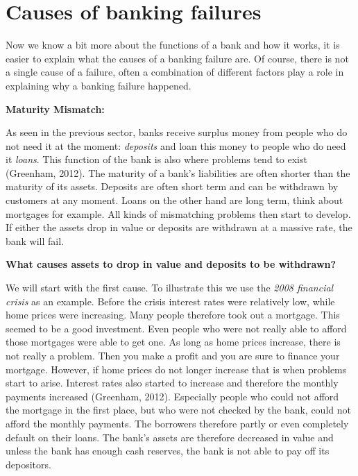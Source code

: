 \documentclass[DIV=calc, paper=a4, fontsize=11pt, twocolumn]{scrartcl}	 %
\begin{document}
\section*{Causes of banking failures}
Now we know a bit more about the functions of a bank and how it works, it is easier to explain what the causes of a banking failure are. Of course, there is not a single cause of a failure, often a combination of different factors play a role in explaining why a banking failure happened.

\textbf{Maturity Mismatch:}

As seen in the previous sector, banks receive surplus money from people who do not need it at the moment: \textit{deposits} and loan this money to people who do need it \textit{loans}. This function of the bank is also where problems tend to exist (Greenham, 2012). The maturity of a bank's liabilities are often shorter than the maturity of its assets. Deposits are often short term and can be withdrawn by customers at any moment. Loans on the other hand are long term, think about mortgages for example. All kinds of mismatching problems then start to develop. If either the assets drop in value or deposits are withdrawn at a massive rate, the bank will fail.

\textbf{What causes assets to drop in value and deposits to be withdrawn?}

We will start with the first cause. To illustrate this we use the \textit{2008 financial crisis} as an example. Before the crisis interest rates were relatively low, while home prices were increasing. Many people therefore took out a mortgage. This seemed to be a good investment. Even people who were not really able to afford those mortgages were able to get one. As long as home prices increase, there is not really a problem. Then you make a profit and you are sure to finance your mortgage. However, if home prices do not longer increase that is when problems start to arise. Interest rates also started to increase and therefore the monthly payments increased (Greenham, 2012). Especially people who could not afford the mortgage in the first place, but who were not checked by the bank, could not afford the monthly payments. The borrowers therefore partly or even completely default on their loans. The bank's assets are therefore decreased in value and unless the bank has enough cash reserves, the bank is not able to pay off its depositors.
\end{document}
